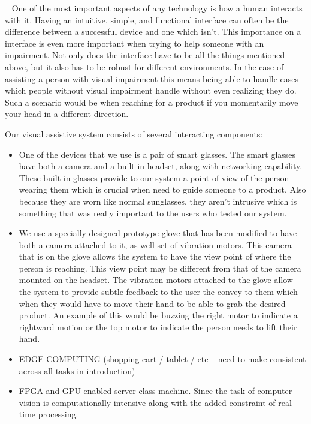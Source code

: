 ~\cite{something}
One of the most important aspects of any technology is how a human interacts with it. Having an intuitive, simple, and functional interface can often be the difference between a successful device and one which isn't. This importance on a interface is even more important when trying to help someone with an impairment. Not only does the interface have to be all the things mentioned above, but it also has to be robust for different environments. In the case of assisting a person with visual impairment this means being able to handle cases which people without visual impairment handle without even realizing they do. Such a scenario would be when reaching for a product if you momentarily move your head in a different direction.

Our visual assistive system consists of several interacting components: 
\begin{itemize}
\item One of the devices that we use is a pair of smart glasses. The smart
glasses have both a camera and a built in headset, along with
networking capability. These built in glasses provide to our system a
point of view of the person wearing them which is crucial when need to
guide someone to a product. Also because they are worn like normal
sunglasses, they aren't intrusive which is something that was really
important to the users who tested our system.

\item We use a specially designed prototype glove that has been
modified to have both a camera attached to it, as well set of
vibration motors. This camera that is on the glove allows the system
to have the view point of where the person is reaching. This view
point may be different from that of the camera mounted on the headset.
The vibration motors attached to the glove allow the system to provide
subtle feedback to the user the convey to them which when they would
have to move their hand to be able to grab the desired product. An
example of this would be buzzing the right motor to indicate a
rightward motion or the top motor to indicate the person needs to lift
their hand.


\item EDGE COMPUTING (shopping cart / tablet / etc -- need to make consistent across all tasks in introduction)

\item FPGA and GPU enabled server class machine. Since the task of
computer vision is computationally intensive along with the added
constraint of real-time processing.

\end{itemize}

